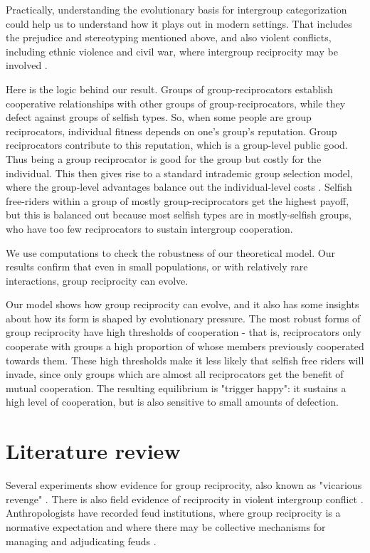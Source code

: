 \documentclass[12pt,a4paper]{article}
\begin{document}
Practically, understanding the evolutionary basis
for intergroup categorization could help us to understand how it plays out 
in modern settings. That includes the prejudice and stereotyping mentioned above,
and also violent conflicts, including ethnic violence and civil war, where
intergroup reciprocity may be involved 
\citep{horowitz1985ethnicgroups,horowitz2001thedeadly,haushofer_both_2010}. 

Here is the logic behind our result. Groups of group-reciprocators
establish cooperative relationships with other groups of group-reciprocators,
while they defect against groups of selfish types. So, when some people are 
group reciprocators, individual fitness depends on one's group's reputation. Group 
reciprocators contribute to this reputation, which is a group-level public good. 
Thus being a group reciprocator is good for the group but costly for the individual. 
This then gives rise to a standard intrademic group selection model, where the group-level advantages balance out the individual-level costs \parencite{wilson1983group,wade1978critical}. Selfish free-riders within a group of mostly group-reciprocators get the highest payoff, but this is balanced
out because most selfish types are in mostly-selfish groups, who have too
few reciprocators to sustain intergroup cooperation.

We use computations to check the robustness of our theoretical model. Our
results confirm that even in small populations, or with relatively rare interactions,
group reciprocity can evolve.

Our model shows how group reciprocity can evolve, and it also has some insights
about how its form is shaped by evolutionary pressure. The most robust forms of
group reciprocity have high thresholds of cooperation - that is, reciprocators
only cooperate with groups a high proportion of whose members previously
cooperated towards them. These high thresholds make it less likely that selfish
free riders will invade, since only groups which are almost all reciprocators
get the benefit of mutual cooperation. The resulting equilibrium is 
"trigger happy": it sustains a high level of cooperation, but is also sensitive 
to small amounts of defection.

\section{Literature review}

Several experiments show evidence for group reciprocity, also known as "vicarious
revenge" \citep{lickel_vicarious_2006,gaertner2008whenrejection,stenstrom_roles_2008,hugh2017intergroup,hugh2019humans,romano2022direct}. There is also field 
evidence of reciprocity in violent intergroup conflict \citep{haushofer_both_2010}.
Anthropologists have recorded feud institutions, where group reciprocity is a
normative expectation and where there may be collective mechanisms for managing 
and adjudicating feuds \citep{boehm1984blood,chagnon1988lifehistories}. 
\end{document}
